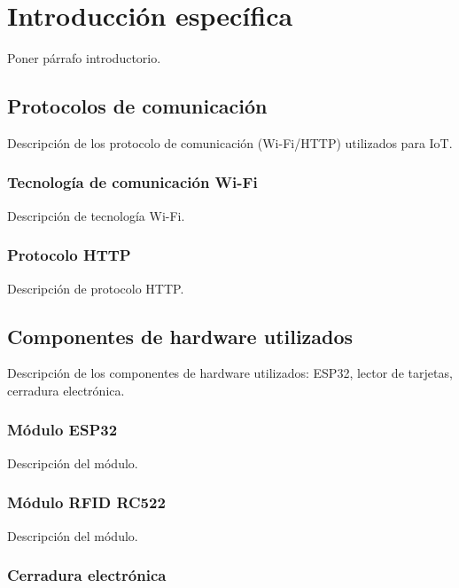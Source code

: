 \chapter{Introducción específica} %

\label{Chapter2}


Poner párrafo introductorio.

\section{Protocolos de comunicación}

Descripción de los protocolo de comunicación (Wi-Fi/HTTP) utilizados para IoT.

\subsection{Tecnología de comunicación Wi-Fi}

Descripción de tecnología Wi-Fi.

\subsection{Protocolo HTTP}

Descripción de protocolo HTTP.

\section{Componentes de hardware utilizados}

Descripción de los componentes de hardware utilizados: ESP32, lector de tarjetas, cerradura electrónica.

\subsection{Módulo ESP32}

Descripción del módulo.

\subsection{Módulo RFID RC522}

Descripción del módulo.

\subsection{Cerradura electrónica}

